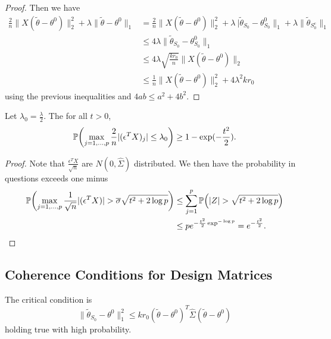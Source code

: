\begin{proof}
  Then we have
  \begin{align}
    \label{eq:64}
    \frac{2}{n} \| X(\tilde \theta - \theta^{0})\|_{2}^{2} + \lambda
    \| \tilde \theta - \theta^{0} \|_{1} &= \frac{2}{n} \| X(\tilde
    \theta - \theta^{0}) \|_{2}^{2} + \lambda\ |\tilde \theta_{S_{0}}
    - \theta^{0}_{S_{0}} \|_{1} + \lambda \| \tilde \theta_{S_{0}^{c}}
    \|_{1} \\
    &\leq 4 \lambda \| \tilde \theta_{S_{0}} - \theta^{0}_{S_{0}}
    \|_{1} \\
    &\leq 4 \lambda \sqrt{\frac{kr_{0}}{n}} \| X(\tilde \theta -
    \theta^{0}) \|_{2} \\
    &\leq \frac{1}{n} \| X(\tilde \theta - \theta^{0}) \|_{2}^{2} + 4
    \lambda^{2} k r_{0}
  \end{align} using the previous inequalities and $4ab \leq a^{2} + 4b^{2}$.
\end{proof}

\begin{thm}
  Let $\lambda_{0} = \frac{\lambda}{2}$.  The for all $t > 0$,
  \begin{equation}
    \label{eq:35}
    \Prob{\max_{j = 1, \dots, p} \frac{2}{n} |(\epsilon^{T} X)_{j}|
      \leq \lambda_{0}} \geq 1 - \exp(-\frac{t^{2}}{2}).
  \end{equation}
\end{thm}

\begin{proof}
  Note that $\frac{\epsilon^{T} X}{\sqrt{n}}$ are $N(0, \hat \Sigma)$
  distributed.  We then have the probability in questions exceeds one
  minus
  \begin{align}
    \label{eq:65}
    \Prob{\max_{j = 1, \dots, p} \frac{1}{\sqrt{n}} |(\epsilon^{T} X)
      | > \overline \sigma \sqrt{t^{2} + 2 \log p}} &\leq
    \sum_{j=1}^{p} \Prob{|Z| > \sqrt{t^{2} + 2 \log p}}\\
    &\leq pe^{-\frac{t^{2}}{2} \exp^{-\log p}} = e^{-\frac{t^{2}}{2}}.
  \end{align}
\end{proof}

\subsection{Coherence Conditions for Design Matrices}
\label{sec:coher-cond-design}

The critical condition is
\begin{equation}
  \label{eq:36}
  \| \tilde \theta_{S_{0}} - \theta^{0} \|_{1}^{2} \leq k r_{0}(\tilde
  \theta - \theta^{0})^{T} \hat \Sigma (\tilde \theta - \theta^{0})
\end{equation} holding true with high probability.

